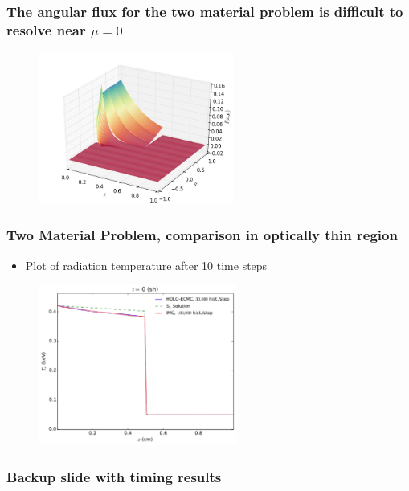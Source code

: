 \documentclass[xcolor=dvipsnames,hyperref={pdfpagelabels=false},unknownkeysallowed]{beamer}
\newlength{\wideitemsep}
\let\olditem\item
\renewcommand{\item}{\setlength{\itemsep}{\wideitemsep}\olditem}
\begin{document}
\begin{frame}   
    \frametitle{The angular flux for the two material problem is difficult to resolve near
    $\mu=0$}
    \begin{figure}
        \includegraphics[width=0.57\textwidth]{ang_flux.png}
    \end{figure}
\end{frame}

\begin{frame}
    \frametitle{Two Material Problem, comparison in optically thin region}
    \begin{block}{}
        \begin{itemize}
            \item Plot of radiation temperature after 10 time steps
        \end{itemize}
    \end{block}
\begin{figure}
    \centering
    \includegraphics[width=0.5799\textwidth]{quick_compare.pdf}
\end{figure}

\end{frame}


\begin{frame}
    \frametitle{Backup slide with timing results}

\end{frame}
\end{document}
